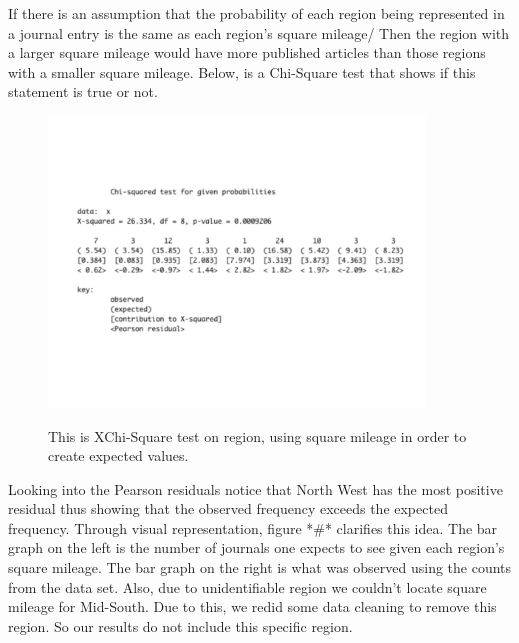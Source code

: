 \documentclass[12pt, letterpaper]{article}
\begin{document}
If there is an assumption that the probability of each region being represented in a journal entry is the same as each region's square mileage/ Then the region with a larger square mileage would have more published articles than those regions with a smaller square mileage. Below, is a Chi-Square test that shows if this statement is true or not.

\begin{figure}[h]
\begin{center}
\includegraphics[width=10cm]{RegionChiSquare2.pdf}
\label{fig: Region XChi-Square with Square Mileage}
\caption{This is XChi-Square test on region, using square mileage in order to create expected values.}
\end{center}
\end{figure}

Looking into the Pearson residuals notice that North West has the most positive residual thus showing that the observed frequency exceeds the expected frequency. Through visual representation, figure *#* clarifies this idea. The bar graph on the left is the number of journals one expects to see given each region's square mileage. The bar graph on the right is what was observed using the counts from the data set. Also, due to unidentifiable region we couldn't locate square mileage for Mid-South. Due to this, we redid some data cleaning to remove this region. So our results do not include this specific region.
\end{document}

